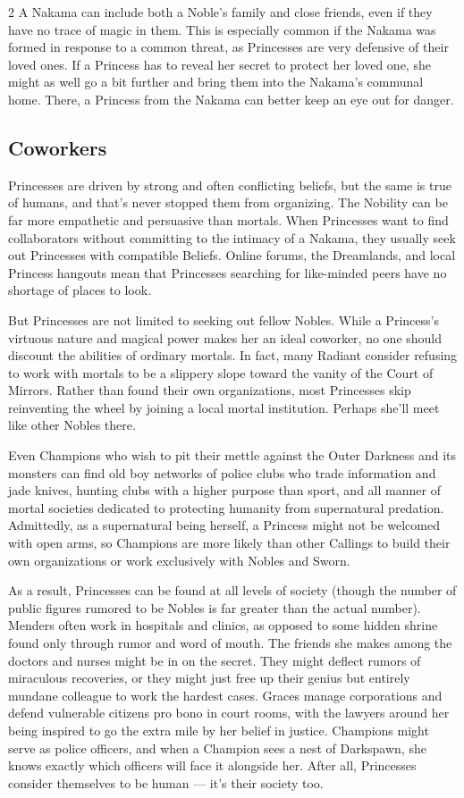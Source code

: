 \begin{multicols}{2}
A Nakama can include both a Noble's family and close friends, even if they have no trace of magic in them. This is especially common if the Nakama was formed in response to a common threat, as Princesses are very defensive of their loved ones. If a Princess has to reveal her secret to protect her loved one, she might as well go a bit further and bring them into the Nakama's communal home. There, a Princess from the Nakama can better keep an eye out for danger.

\subsection*{Coworkers}

Princesses are driven by strong and often conflicting beliefs, but the same is true of humans, and that's never stopped them from organizing. The Nobility can be far more empathetic and persuasive than mortals. When Princesses want to find collaborators without committing to the intimacy of a Nakama, they usually seek out Princesses with compatible Beliefs. Online forums, the Dreamlands, and local Princess hangouts mean that Princesses searching for like-minded peers have no shortage of places to look.

But Princesses are not limited to seeking out fellow Nobles. While a Princess's virtuous nature and magical power makes her an ideal coworker, no one should discount the abilities of ordinary mortals. In fact, many Radiant consider refusing to work with mortals to be a slippery slope toward the vanity of the Court of Mirrors. Rather than found their own organizations, most Princesses skip reinventing the wheel by joining a local mortal institution. Perhaps she'll meet like other Nobles there. 

Even Champions who wish to pit their mettle against the Outer Darkness and its monsters can find old boy networks of police clubs who trade information and jade knives, hunting clubs with a higher purpose than sport, and all manner of mortal societies dedicated to protecting humanity from supernatural predation. Admittedly, as a supernatural being herself, a Princess might not be welcomed with open arms, so Champions are more likely than other Callings to build their own organizations or work exclusively with Nobles and Sworn. 

As a result, Princesses can be found at all levels of society (though the number of public figures rumored to be Nobles is far greater than the actual number). Menders often work in hospitals and clinics, as opposed to some hidden shrine found only through rumor and word of mouth. The friends she makes among the doctors and nurses might be in on the secret. They might deflect rumors of miraculous recoveries, or they might just free up their genius but entirely mundane colleague to work the hardest cases. Graces manage corporations and defend vulnerable citizens pro bono in court rooms, with the lawyers around her being inspired to go the extra mile by her belief in justice. Champions might serve as police officers, and when a Champion sees a nest of Darkspawn, she knows exactly which officers will face it alongside her. After all, Princesses consider themselves to be human — it's their society too. 


\end{multicols}
